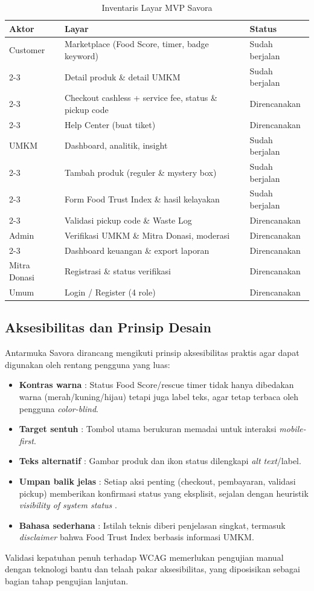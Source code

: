 \begin{table}[htbp]
\centering
\caption{Inventaris Layar MVP Savora}
\label{tab:screens}
\small
\begin{tabularx}{\textwidth}{|l|X|l|}
\hline
\textbf{Aktor} & \textbf{Layar} & \textbf{Status} \\
\hline
Customer & Marketplace (Food Score, timer, badge keyword) & Sudah berjalan \\
\cline{2-3}
& Detail produk \& detail UMKM & Sudah berjalan \\
\cline{2-3}
& Checkout cashless + service fee, status \& pickup code & Direncanakan \\
\cline{2-3}
& Help Center (buat tiket) & Direncanakan \\
\hline
UMKM & Dashboard, analitik, insight & Sudah berjalan \\
\cline{2-3}
& Tambah produk (reguler \& mystery box) & Sudah berjalan \\
\cline{2-3}
& Form Food Trust Index \& hasil kelayakan & Sudah berjalan \\
\cline{2-3}
& Validasi pickup code \& Waste Log & Direncanakan \\
\hline
Admin & Verifikasi UMKM \& Mitra Donasi, moderasi & Direncanakan \\
\cline{2-3}
& Dashboard keuangan \& export laporan & Direncanakan \\
\hline
Mitra Donasi & Registrasi \& status verifikasi & Direncanakan \\
\hline
Umum & Login / Register (4 role) & Direncanakan \\
\hline
\end{tabularx}
\end{table}

\subsection{Aksesibilitas dan Prinsip Desain}

Antarmuka Savora dirancang mengikuti prinsip aksesibilitas praktis agar dapat digunakan oleh
rentang pengguna yang luas:

\begin{itemize}[leftmargin=*]
    \item \textbf{Kontras warna} : Status Food Score/rescue timer tidak hanya dibedakan warna
    (merah/kuning/hijau) tetapi juga label teks, agar tetap terbaca oleh pengguna \textit{color-blind}.
    \item \textbf{Target sentuh} : Tombol utama berukuran memadai untuk interaksi \textit{mobile-first}.
    \item \textbf{Teks alternatif} : Gambar produk dan ikon status dilengkapi \textit{alt text}/label.
    \item \textbf{Umpan balik jelas} : Setiap aksi penting (checkout, pembayaran, validasi pickup)
    memberikan konfirmasi status yang eksplisit, sejalan dengan heuristik \textit{visibility of system
    status} \cite{nielsen2020heuristics}.
    \item \textbf{Bahasa sederhana} : Istilah teknis diberi penjelasan singkat, termasuk
    \textit{disclaimer} bahwa Food Trust Index berbasis informasi UMKM.
\end{itemize}

Validasi kepatuhan penuh terhadap WCAG memerlukan pengujian manual dengan teknologi bantu dan
telaah pakar aksesibilitas, yang diposisikan sebagai bagian tahap pengujian lanjutan.
